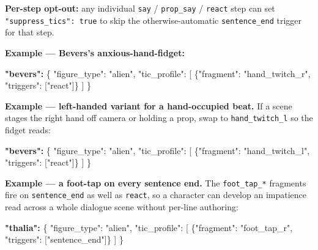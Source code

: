 \documentclass[
  12pt,
  letterpaper,
]{book}
\newenvironment{Shaded}{}{}
\newcommand{\DataTypeTok}[1]{\textcolor[rgb]{0.56,0.13,0.00}{#1}}
\newcommand{\ErrorTok}[1]{\textcolor[rgb]{1.00,0.00,0.00}{\textbf{#1}}}
\newcommand{\FunctionTok}[1]{\textcolor[rgb]{0.02,0.16,0.49}{#1}}
\newcommand{\OtherTok}[1]{\textcolor[rgb]{0.00,0.44,0.13}{#1}}
\newcommand{\StringTok}[1]{\textcolor[rgb]{0.25,0.44,0.63}{#1}}
\begin{document}
\textbf{Per-step opt-out:} any individual \texttt{say} /
\texttt{prop\_say} / \texttt{react} step can set
\texttt{"suppress\_tics":\ true} to skip the otherwise-automatic
\texttt{sentence\_end} trigger for that step.

\textbf{Example --- Bevers's anxious-hand-fidget:}

\begin{Shaded}
\begin{Highlighting}[]
\ErrorTok{"bevers":} \FunctionTok{\{}
  \DataTypeTok{"figure\_type"}\FunctionTok{:} \StringTok{"alien"}\FunctionTok{,}
  \DataTypeTok{"tic\_profile"}\FunctionTok{:} \OtherTok{[}
    \FunctionTok{\{}\DataTypeTok{"fragment"}\FunctionTok{:} \StringTok{"hand\_twitch\_r"}\FunctionTok{,} \DataTypeTok{"triggers"}\FunctionTok{:} \OtherTok{[}\StringTok{"react"}\OtherTok{]}\FunctionTok{\}}
  \OtherTok{]}
\FunctionTok{\}}
\end{Highlighting}
\end{Shaded}

\textbf{Example --- left-handed variant for a hand-occupied beat.}
If a scene stages the right hand off camera or holding a prop, swap
to \texttt{hand\_twitch\_l} so the fidget reads:

\begin{Shaded}
\begin{Highlighting}[]
\ErrorTok{"bevers":} \FunctionTok{\{}
  \DataTypeTok{"figure\_type"}\FunctionTok{:} \StringTok{"alien"}\FunctionTok{,}
  \DataTypeTok{"tic\_profile"}\FunctionTok{:} \OtherTok{[}
    \FunctionTok{\{}\DataTypeTok{"fragment"}\FunctionTok{:} \StringTok{"hand\_twitch\_l"}\FunctionTok{,} \DataTypeTok{"triggers"}\FunctionTok{:} \OtherTok{[}\StringTok{"react"}\OtherTok{]}\FunctionTok{\}}
  \OtherTok{]}
\FunctionTok{\}}
\end{Highlighting}
\end{Shaded}

\textbf{Example --- a foot-tap on every sentence end.} The
\texttt{foot\_tap\_*} fragments fire on \texttt{sentence\_end} as well
as \texttt{react}, so a character can develop an impatience read across
a whole dialogue scene without per-line authoring:

\begin{Shaded}
\begin{Highlighting}[]
\ErrorTok{"thalia":} \FunctionTok{\{}
  \DataTypeTok{"figure\_type"}\FunctionTok{:} \StringTok{"alien"}\FunctionTok{,}
  \DataTypeTok{"tic\_profile"}\FunctionTok{:} \OtherTok{[}
    \FunctionTok{\{}\DataTypeTok{"fragment"}\FunctionTok{:} \StringTok{"foot\_tap\_r"}\FunctionTok{,} \DataTypeTok{"triggers"}\FunctionTok{:} \OtherTok{[}\StringTok{"sentence\_end"}\OtherTok{]}\FunctionTok{\}}
  \OtherTok{]}
\FunctionTok{\}}
\end{Highlighting}
\end{Shaded}
\end{document}

